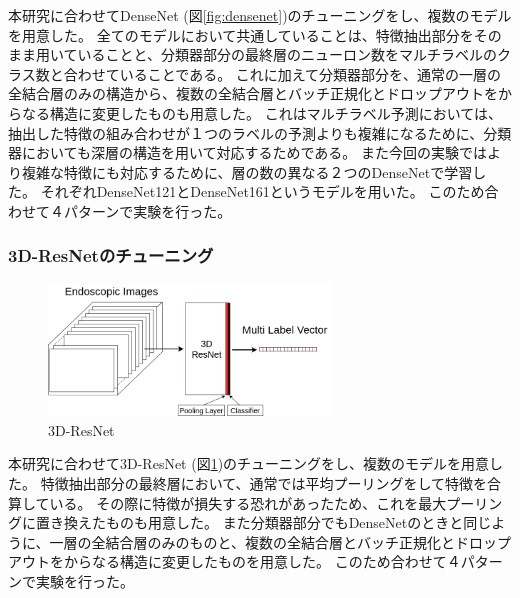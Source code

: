 本研究に合わせてDenseNet (図\ref{fig:densenet})のチューニングをし、複数のモデルを用意した。
全てのモデルにおいて共通していることは、特徴抽出部分をそのまま用いていることと、分類器部分の最終層のニューロン数をマルチラベルのクラス数と合わせていることである。
これに加えて分類器部分を、通常の一層の全結合層のみの構造から、複数の全結合層とバッチ正規化とドロップアウトをからなる構造に変更したものも用意した。
これはマルチラベル予測においては、抽出した特徴の組み合わせが１つのラベルの予測よりも複雑になるために、分類器においても深層の構造を用いて対応するためである。
また今回の実験ではより複雑な特徴にも対応するために、層の数の異なる２つのDenseNetで学習した。
それぞれDenseNet121\cite{DenseNet}とDenseNet161\cite{DenseNet}というモデルを用いた。
このため合わせて４パターンで実験を行った。
\subsubsection{3D-ResNetのチューニング}

\begin{figure}[tb]
    \begin{center}
        \includegraphics[width=75mm]{./fig/ieice3.png}
        \caption{3D-ResNet}
        \label{fig:3d_resnet}
    \end{center}
\end{figure}

本研究に合わせて3D-ResNet (図\ref{fig:3d_resnet})のチューニングをし、複数のモデルを用意した。
特徴抽出部分の最終層において、通常では平均プーリングをして特徴を合算している。
その際に特徴が損失する恐れがあったため、これを最大プーリングに置き換えたものも用意した。
また分類器部分でもDenseNetのときと同じように、一層の全結合層のみのものと、複数の全結合層とバッチ正規化とドロップアウトをからなる構造に変更したものを用意した。
このため合わせて４パターンで実験を行った。

